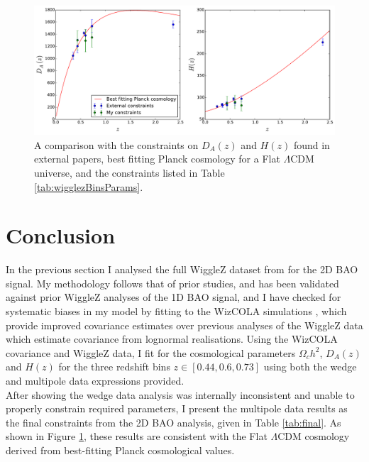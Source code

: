 \documentclass[titlesmallcaps, examinerscopy, copyrightpage]{uqthesis}
\begin{document}
\begin{figure}[h!]
  \begin{center}
    \includegraphics[width=\textwidth]{images/external.pdf}
  \end{center}
  \caption{A comparison with the constraints on $D_A(z)$ and $H(z)$ found in external papers, best fitting Planck cosmology for a Flat $\Lambda$CDM universe, and the constraints listed in Table \ref{tab:wigglezBinsParams}.}
  \label{fig:external}
\end{figure}







\chapter{Conclusion}


In the previous section I analysed the full WiggleZ dataset from \citet{KazinKoda2014} for the 2D BAO signal. My methodology follows that of prior studies, and has been validated against prior WiggleZ analyses of the 1D BAO signal, and I have checked for systematic biases in my model by fitting to the WizCOLA simulations \citep{KodaBlake2015}, which provide improved covariance estimates over previous analyses of the WiggleZ data which estimate covariance from lognormal realisations. Using the WizCOLA covariance and WiggleZ data, I fit for the cosmological parameters $\Omega_c h^2$, $D_A(z)$ and $H(z)$ for the three redshift bins $z \in \left[0.44, 0.6, 0.73\right]$ using both the wedge and multipole data expressions provided.\\

After showing the wedge data analysis was internally inconsistent and unable to properly constrain required parameters, I present the multipole data results as the final constraints from the 2D BAO analysis, given in Table \ref{tab:final}. As shown in Figure \ref{fig:external}, these results are consistent with the Flat $\Lambda$CDM cosmology derived from best-fitting Planck cosmological values.\\
\end{document}
